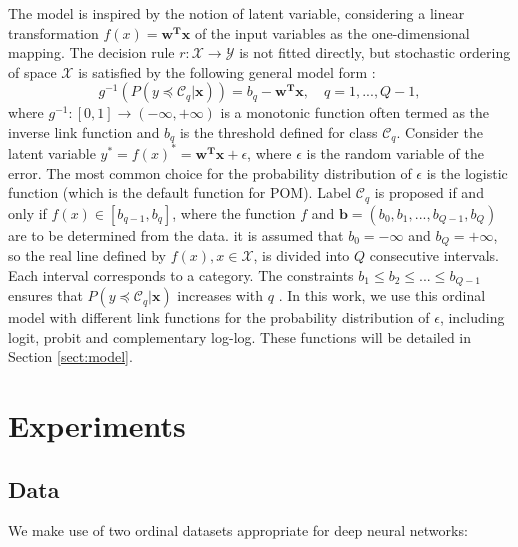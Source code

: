 \documentclass[journal]{IEEEtran}
\begin{document}
	The model is inspired by the notion of latent variable, considering a linear transformation $f(x) = \mathbf{w^Tx}$ of the input variables as the one-dimensional mapping. The decision rule $r: \mathcal{X} \rightarrow \mathcal{Y}$ is not fitted directly, but stochastic ordering of space $\mathcal{X}$ is satisfied by the following general model form \cite{herbrich2000large}:
	\begin{equation}
		g^{-1}(P(y \preceq \mathcal{C}_q | \mathbf{x})) = b_q - \mathbf{w^Tx}, \quad q = 1, ..., Q-1,
	\end{equation}
	where $g^{-1} : [0,1] \rightarrow (-\infty, +\infty)$ is a monotonic function often termed as the inverse link function and $b_q$ is the threshold defined for class $\mathcal{C}_q$. Consider the latent variable $y^* = f(x)^* = \mathbf{w^Tx} + \epsilon$, where $\epsilon$ is the random variable of the error. The most common choice for the probability distribution of $\epsilon$ is the logistic function (which is the default function for POM). Label $\mathcal{C}_q$ is proposed if and only if $f(x) \in [b_{q-1}, b_q]$, where the function $f$ and $\mathbf{b} = (b_0, b_1, ..., b_{Q-1}, b_Q)$ are to be determined from the data. it is assumed that $b_0 = -\infty$ and $b_Q = +\infty$, so the real line defined by $f(x), x \in \mathcal{X}$, is divided into $Q$ consecutive intervals. Each interval corresponds to a category. The constraints $b_1 \le b_2 \le ... \le b_{Q-1}$ ensures that $P(y \preceq \mathcal{C}_q | \mathbf{x})$ increases with $q$ \cite{mccullagh1980regression}.
	In this work, we use this ordinal model with different link functions for the probability distribution of $\epsilon$, including logit, probit and complementary log-log. These functions will be detailed in Section \ref{sect:model}.
	\section{Experiments}
	\label{sect:experiments}
	\subsection{Data}
	We make use of two ordinal datasets appropriate for deep neural networks:
	
\end{document}
